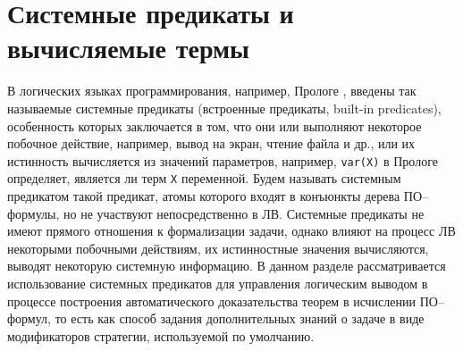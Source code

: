 \section{Системные предикаты и вычисляемые термы}
В логических языках программирования, например, Прологе \cite{Bratko}, введены так называемые системные предикаты (встроенные предикаты, built-in predicates), особенность которых заключается в том, что они или выполняют некоторое побочное действие, например, вывод на экран, чтение файла и др., или их истинность вычисляется из значений параметров, например, \texttt{var(X)} в Прологе определяет, является ли терм \texttt{X} переменной. Будем называть системным предикатом такой предикат, атомы которого входят в конъюнкты дерева ПО--формулы, но не участвуют непосредственно в ЛВ. Системные предикаты не имеют прямого отношения к формализации задачи, однако влияют на процесс ЛВ некоторыми побочными действиям, их истинностные значения вычисляются, выводят некоторую системную информацию. В данном разделе рассматривается использование системных предикатов для управления логическим выводом в процессе построения автоматического доказательства теорем в исчислении ПО--формул, то есть как способ задания дополнительных знаний о задаче в виде модификаторов стратегии, используемой по умолчанию.

